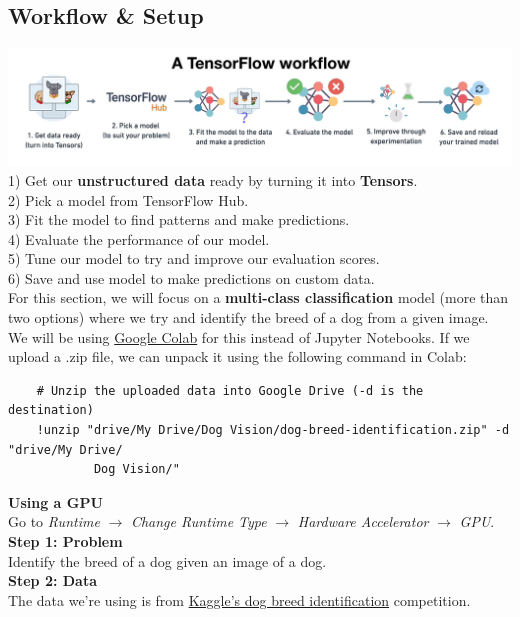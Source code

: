 \documentclass[11pt, a4paper]{article}
\begin{document}
\begin{spacing}{1.1}
	\subsection{Workflow \& Setup}
	\includegraphics[scale=.4]{tflow} \\
	1) Get our \textbf{unstructured data} ready by turning it into \textbf{Tensors}. \\
	2) Pick a model from TensorFlow Hub. \\
	3) Fit the model to find patterns and make predictions. \\
	4) Evaluate the performance of our model. \\
	5) Tune our model to try and improve our evaluation scores. \\
	6) Save and use model to make predictions on custom data. \vspace*{1.5mm}\\
	For this section, we will focus on a \textbf{multi-class classification} model (more than two options) where we try and identify the breed of a dog from a given image. We will be using \href{https://colab.research.google.com/notebooks/}{Google Colab} for this instead of Jupyter Notebooks. If we upload a .zip file, we can unpack it using the following command in Colab: 
	\begin{lstlisting}
	# Unzip the uploaded data into Google Drive (-d is the destination)
	!unzip "drive/My Drive/Dog Vision/dog-breed-identification.zip" -d "drive/My Drive/
	        Dog Vision/" \end{lstlisting} \vspace*{1mm}
	\textbf{Using a GPU} \\
	Go to \textit{Runtime} $\rightarrow$ \textit{Change Runtime Type} $\rightarrow$ \textit{Hardware Accelerator} $\rightarrow$ \textit{GPU}. \vspace*{1.5mm} \\
	\textbf{Step 1: Problem} \\
	Identify the breed of a dog given an image of a dog. \vspace*{1.5mm} \\
	\textbf{Step 2: Data} \\
	The data we're using is from \href{https://www.kaggle.com/c/dog-breed-identification/data}{Kaggle's dog breed identification} competition. \vspace*{1.5mm} \\

\end{spacing}
\end{document}
